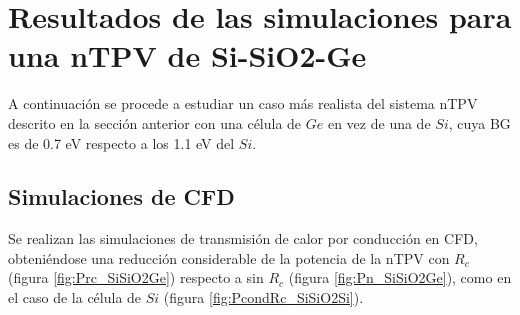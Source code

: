 \section{Resultados de las simulaciones para una nTPV de Si-SiO2-Ge}\label{sec:res_SiSiO2Ge}
A continuación se procede a estudiar un caso más realista del sistema nTPV descrito en la sección anterior con una célula de $Ge$ en vez de una de $Si$, cuya BG es de 0.7 eV respecto a los 1.1 eV del $Si$.
\subsection{Simulaciones de CFD}
Se realizan las simulaciones de transmisión de calor por conducción en CFD, obteniéndose una reducción considerable de la potencia de la nTPV con $R_c$ (figura \ref{fig:Prc_SiSiO2Ge}) respecto a sin $R_c$ (figura \ref{fig:Pn_SiSiO2Ge}), como en el caso de la célula de $Si$ (figura \ref{fig:PcondRc_SiSiO2Si}).
\graphicspath{ {./figuras/Resultados/conduccion/pdf/} }
